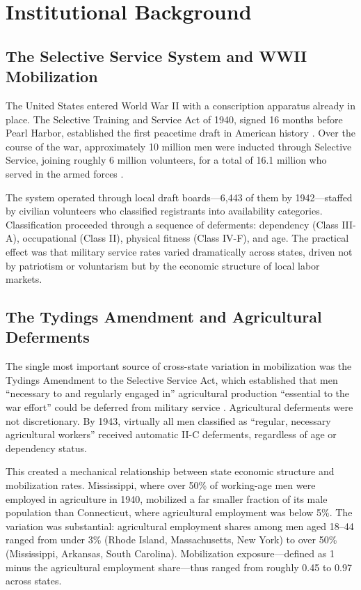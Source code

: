 \documentclass[12pt]{article}
\begin{document}
\section{Institutional Background}

\subsection{The Selective Service System and WWII Mobilization}

The United States entered World War II with a conscription apparatus already in place. The Selective Training and Service Act of 1940, signed 16 months before Pearl Harbor, established the first peacetime draft in American history \citep{selectiveservice1947}. Over the course of the war, approximately 10 million men were inducted through Selective Service, joining roughly 6 million volunteers, for a total of 16.1 million who served in the armed forces \citep{clodfelter2002}.

The system operated through local draft boards---6,443 of them by 1942---staffed by civilian volunteers who classified registrants into availability categories. Classification proceeded through a sequence of deferments: dependency (Class III-A), occupational (Class II), physical fitness (Class IV-F), and age. The practical effect was that military service rates varied dramatically across states, driven not by patriotism or voluntarism but by the economic structure of local labor markets.

\subsection{The Tydings Amendment and Agricultural Deferments}

The single most important source of cross-state variation in mobilization was the Tydings Amendment to the Selective Service Act, which established that men ``necessary to and regularly engaged in'' agricultural production ``essential to the war effort'' could be deferred from military service \citep{hershey1947}. Agricultural deferments were not discretionary. By 1943, virtually all men classified as ``regular, necessary agricultural workers'' received automatic II-C deferments, regardless of age or dependency status.

This created a mechanical relationship between state economic structure and mobilization rates. Mississippi, where over 50\% of working-age men were employed in agriculture in 1940, mobilized a far smaller fraction of its male population than Connecticut, where agricultural employment was below 5\%. The variation was substantial: agricultural employment shares among men aged 18--44 ranged from under 3\% (Rhode Island, Massachusetts, New York) to over 50\% (Mississippi, Arkansas, South Carolina). Mobilization exposure---defined as 1 minus the agricultural employment share---thus ranged from roughly 0.45 to 0.97 across states.
\end{document}
